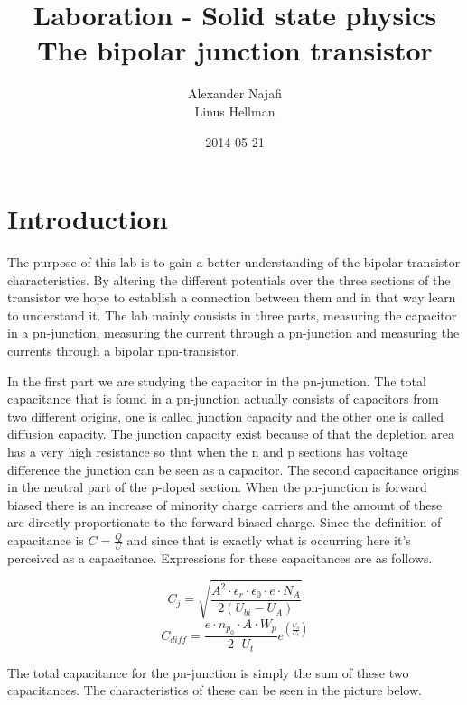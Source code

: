 \documentclass[a4paper]{article}
\title{Laboration - Solid state physics\\ The bipolar junction transistor}
\author{Alexander Najafi \\ Linus Hellman}
\date{2014-05-21}
\begin{document}
\maketitle
\thispagestyle{empty}
\newpage

\tableofcontents
\newpage
\section{Introduction}
The purpose of this lab is to gain a better understanding of the bipolar transistor characteristics. By altering the different potentials over the three sections of the transistor we hope to establish a connection between them and in that way learn to understand it. The lab mainly consists in three parts, measuring the capacitor in a pn-junction, measuring the current through a pn-junction and measuring the currents through a bipolar npn-transistor.

In the first part we are studying the capacitor in the pn-junction. The total capacitance that is found in a pn-junction actually consists of capacitors from two different origins, one is called junction capacity and the other one is called diffusion capacity. The junction capacity exist because of that the depletion area has a very high resistance so that when the n and p sections has voltage difference the junction can be seen as a capacitor. The second capacitance origins in the neutral part of the p-doped section. When the pn-junction is forward biased there is an increase of minority charge carriers and the amount of these are directly proportionate to the forward biased charge. Since the definition of capacitance is $C=\frac{Q}{U}$ and since that is exactly what is occurring here it's perceived as a capacitance. Expressions for these capacitances are as follows.

\begin{equation}
C_j=\sqrt{\frac{A^2{\cdot}\epsilon_r{\cdot}\epsilon_0{\cdot}e{\cdot}N_A}{2(U_{bi}-U_A)}}
\end{equation}
\begin{equation}
C_{diff}=\frac{e{\cdot}n_{p_0}{\cdot}A{\cdot}W_p}{2{\cdot}U_t}e^{(\frac{U_a}{U_t})}
\end{equation}

The total capacitance for the pn-junction is simply the sum of these two capacitances. The characteristics of these can be seen in the picture below.
\end{document}
